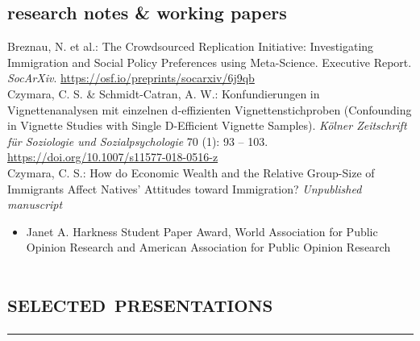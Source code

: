 \documentclass[11pt, a4paper]{article}
\newcommand{\years}[1]{\marginnote{~~#1}}
\begin{document}
\subsection*{research notes \& working papers}
\years{2019}Breznau, N. et al.: The Crowdsourced Replication Initiative: Investigating Immigration and Social Policy Preferences using Meta-Science. Executive Report. \textit{SocArXiv}. \href{https://osf.io/preprints/socarxiv/6j9qb}{https://osf.io/preprints/socarxiv/6j9qb}\\
\years{2018}Czymara, C. S. \& Schmidt-Catran, A. W.: Konfundierungen in Vignettenanalysen mit einzelnen d-effizienten Vignettenstichproben (Confounding in Vignette Studies with Single D-Efficient Vignette Samples). \textit{K\"olner Zeitschrift f\"ur Soziologie und Sozialpsychologie} 70 (1): 93 -- 103. \href{https://doi.org/10.1007/s11577-018-0516-z}{https://doi.org/10.1007/s11577-018-0516-z}\\
\years{2014}Czymara, C. S.: How do Economic Wealth and the Relative Group-Size of Immigrants Affect Natives' Attitudes toward Immigration? \textit{Unpublished manuscript}
\begin{itemize}[nolistsep]
	\item Janet A. Harkness Student Paper Award, World Association for Public Opinion Research and American Association for Public Opinion Research
\end{itemize}
\section*{\textsc{selected presentations}}
\vskip-20pt{\noindent\rule{\textwidth}{1pt}}
\end{document}
